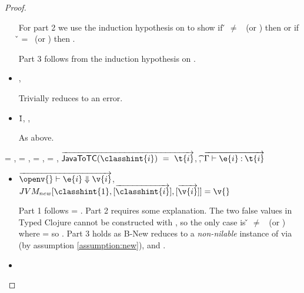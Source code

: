 \begin{lemma}
\begin{proof}
\begin{case}[T-Do]
\begin{itemize}
\begin{subcase}[B-Do]
For part 2 we use the induction hypothesis on 
to show if \v{} $\not=$ \false\ (or \nil) then
        {\satisfies{\openv{}}{\thenprop{\prop{}}}}
        or
  if \v{} = \false\ (or \nil) then
        {\satisfies{\openv{}}{\elseprop{\prop{}}}}.

Part 3 follows from the induction hypothesis on .
    \end{subcase}
  \item[]

\begin{subcase}[BE-Do1]
  \opsem {\openv{}} {} {},
  \opsem {\openv{}} {\e{}} {\errorval{\v{}}}

        Trivially reduces to an error.
\end{subcase}
  \item[]
\begin{subcase}[BE-Do2]
  \opsem {\openv{}} {} {\v{1}},
  \opsem {\openv{}} {} {\errorvalv{}},
  \opsem {\openv{}} {\e{}} {\errorvalv{}}

        As above.
\end{subcase}
\end{itemize}
\end{case}

\begin{case}[T-NewStatic]
  \e{} = { {\classhint{}} 
                                                          {\class{}} {}},
  \object{} = \emptyobject{},
\thenprop{\prop{}} = \topprop{},
\elseprop{\prop{}} = \botprop{},
   $\overrightarrow{
\javatotc {\classhint{i}}
          {\t{i}}
          }$,
  \javatotc {\classhint{}}
            {\t{}},
            $
  \overrightarrow{
  \judgementtwo {\propenv{}}
                    {\hastype {\e{i}} {\t{i}}}
                  }$

\begin{itemize}
  \item[]
\begin{subcase}[B-New]
  $
  \overrightarrow{
  \opsem {\openv{}}
         {\e{i}}
         {\v{i}}
       }$,
         $\newjava {\classhint{1}}
                  {\overrightarrow{\classhint{i}}}
                  {\overrightarrow{\v{i}}}
                  {\v{}}$

Part 1 follows \object{} = \emptyobject{}.
Part 2 requires some explanation. The two false values in Typed Clojure
cannot be constructed with \newliteral, so the only case is \v{} $\not=$ \false\ (or \nil)
where \thenprop{\prop{}} = \topprop{} so \satisfies{\openv{}}{\thenprop{\prop{}}}.
Part 3 holds as B-New reduces to a \emph{non-nilable}
instance of \class{} via \newjavaliteral (by assumption \ref{assumption:new}), and \javatotc{\classhint{}}{\t{}}.
\end{subcase}
  \item[]


\end{itemize}
\end{case}
\end{proof}
\end{lemma}
